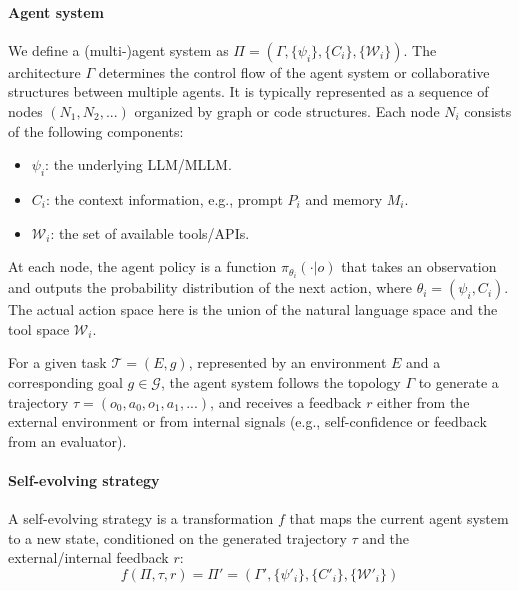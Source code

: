 \paragraph{Agent system} We define a (multi-)agent system as $\Pi =(\Gamma,\{\psi_i\}, \{C_i\},\{\mathcal{W}_i\})$. The architecture $\Gamma$ determines the control flow of the agent system or collaborative structures between multiple agents. It is typically represented as a sequence of nodes $(N_1, N_2, ...)$ organized by graph or code structures. Each node $N_i$ consists of the following components:
\begin{itemize}
\item $\psi_i$: the underlying LLM/MLLM.
\item $C_i$: the context information, e.g., prompt $P_i$ and memory $M_i$.
\item $\mathcal{W}_i$: the set of available tools/APIs.
\end{itemize}

At each node, the agent policy is a function $\pi_{\theta_i}(\cdot|o)$ that takes an observation and outputs the probability distribution of the next action, where $\theta_i=(\psi_i, C_i)$. The actual action space here is the union of the natural language space and the tool space $\mathcal{W}_i$.

For a given task $\mathcal{T}=(E, g)$, represented by an environment $E$ and a corresponding goal $g\in \mathcal{G}$, the agent system follows the topology $\Gamma$ to generate a trajectory $\tau=(o_0, a_0, o_1, a_1,...)$, and receives a feedback $r$ either from the external environment or from internal signals (e.g., self-confidence or feedback from an evaluator).

\paragraph{Self-evolving strategy} A self-evolving strategy is a transformation $f$ that maps the current agent system to a new state, conditioned on the generated trajectory $\tau$ and the external/internal feedback $r$:  
\begin{equation}
    f(\Pi, \tau, r)=\Pi'=(\Gamma',\{\psi'_i\}, \{C'_i\}, \{\mathcal{W}'_i\})
\end{equation}

